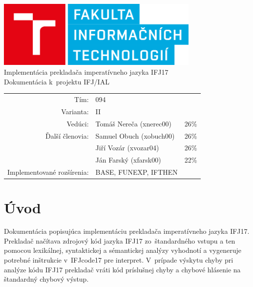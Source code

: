 \documentclass{article}
\begin{document}
    \begin{titlepage}
        \begin{center}
            
            \includegraphics[width=10cm]{FITlogo.png}\\[30mm]
            
            \LARGE
            Implementácia prekladača imperatívneho jazyka IFJ17 \\
            \large
            Dokumentácia k~projektu IFJ/IAL\\[55mm]
            
            \begin{tabular}{r l l}
                Tím: & 094 & \\
                Varianta: & II & \\
                Vedúci: & Tomáš Nereča (xnerec00) & 26\% \\
                Ďalší členovia: & Samuel Obuch (xobuch00) & 26\% \\
                    & Jiří Vozár (xvozar04) & 26\% \\
                    & Ján Farský (xfarsk00) & 22\% \\
                Implementované rozšírenia: & BASE, FUNEXP, IFTHEN &\\
            \end{tabular}
            
        \end{center}
    \end{titlepage}

    \tableofcontents
        \thispagestyle{empty}
        \newpage
        \setcounter{page}{1}
    \newpage
    
    \section{Úvod}
        Dokumentácia popisujúca implementáciu prekladača imperatívneho jazyka IFJ17. Prekladač načítava
        zdrojový kód jazyka IFJ17 zo~štandardného vstupu a ten pomocou lexikálnej, syntaktickej a sémantickej
        analýzy vyhodnotí a vygeneruje potrebné inštrukcie v~IFJcode17 pre interpret. V~prípade
        výskytu chyby pri analýze kódu IFJ17 prekladač vráti kód príslušnej chyby a chybové hlásenie na štandardný
        chybový výstup.
        
\end{document}
